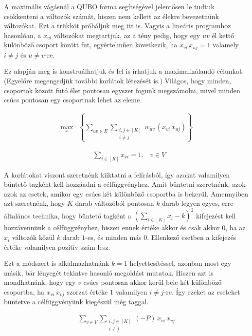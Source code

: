 A maximális vágásnál a QUBO forma segítségével jelentősen le tudtuk csökkenteni a változók számát, hiszen nem kellett az élekre bevezetnünk változókat. Ezt a trükköt próbáljuk meg itt is.
Vagyis a lineáris programhoz hasonlóan, a $x_{vi}$ változókat megtartjuk, az a tény pedig, hogy egy $uv$ él kettő különböző csoport között fut, egyértelműen következik, ha $x_{vi} \, x_{uj}=1$ valamely $i \neq j$ és $u \neq v$-re.

Ez alapján meg is konstruálhatjuk és fel is írhatjuk a maximalizálandó célunkat. (Egyelőre megengedjük további korlátok létezését is.) Világos, hogy minden, csoportok között futó élet pontosan egyszer fogunk megszámolni, mivel minden csúcs pontosan egy csoportnak lehet az eleme.

\begin{align}
	 \max_{x} & \left\{ \sum _{uv \in E}  \sum _{ \substack{ i,j \in [K] \\  i \neq j}} w_{uv}\,(x_{vi} \, x_{uj}) \right\}
\end{align}

\begin{align}
	&\sum _{i \in [K]} x_{vi} = 1, &v \in V
\end {align}

A korlátokat viszont szeretnénk kiiktatni a felírásból, így azokat valamilyen büntető tagként kell hozzáadni a célfüggvényhez. Amit büntetni szeretnénk, azok azok az esetek, amikor egy csúcs két különböző csoportba is bekerül. Amennyiben azt szeretnénk, hogy $K$ darab változóból pontosan $k$ darab legyen egyes, erre általános technika, hogy büntető tagként a $(\sum _{i \in [K]} x_i - k)^2 $ kifejezést kell hozzávennünk a célfüggvényhez, hiszen ennek értéke akkor és csak akkor $0$, ha az $x_i$ változók közül $k$ darab $1$-es, és minden más $0$. Ellenkező esetben a kifejezés értéke valamilyen pozitív szám lesz.

Ezt a módszert is alkalmazhatnánk $k=1$ helyettesítéssel, azonban most egy másik, bár lényegét tekintve hasonló megoldást mutatok. Hiszen azt is mondhatnánk, hogy egy $v$ csúcs pontosan akkor kerül bele két különböző csoportba, ha $x_{vi} \, x_{vj}$ szorzat értéke $1$ valamilyen $i \neq j$-re. Így ezeket az eseteket büntetve a célfüggvényünk kiegészül még  taggal. 

\begin{align}
	\sum _{v \in V } \sum _{\substack{ i,j \in [K] \\  i \neq j}} (-P) \, x_{vi} \, x_{vj} \label{QUBOOnehotonlyone}
\end{align}

